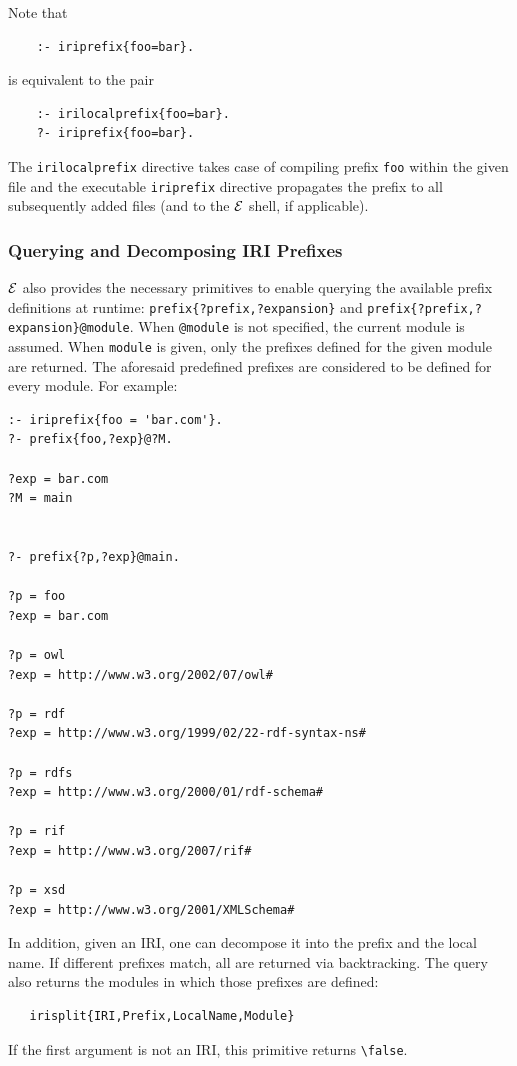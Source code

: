 \documentclass[11pt]{article}
\newcommand{\ERGO}{\mbox{\ensuremath{\cal{E}}\smaller{{\sc{RGO}}}}\xspace}
\newcommand{\FLSYSTEM}{\ERGO}
\newcommand{\bs}{\textbackslash}
\begin{document}
Note that
\begin{verbatim}
    :- iriprefix{foo=bar}.
\end{verbatim}
is equivalent to the pair
\begin{verbatim}
    :- irilocalprefix{foo=bar}.
    ?- iriprefix{foo=bar}.
\end{verbatim}
The \texttt{irilocalprefix} directive  takes case of compiling prefix
\texttt{foo} within the given file and the executable \texttt{iriprefix}   
directive propagates the prefix to all subsequently added files (and to the
\FLSYSTEM shell, if applicable).

\subsubsection{Querying and Decomposing IRI Prefixes}

\FLSYSTEM also provides the necessary primitives to enable querying the
available prefix definitions at runtime:
\texttt{prefix\{?prefix,?expansion\}} and
\texttt{prefix\{?prefix,?expansion\}@module}.
When {\tt @module}  is not
specified, the current module is assumed. When {\tt module} is given,
only the prefixes defined for the given module are returned. The
aforesaid predefined prefixes are considered to be defined for every
module. For example:
\begin{verbatim}
:- iriprefix{foo = 'bar.com'}.
?- prefix{foo,?exp}@?M.

?exp = bar.com
?M = main


?- prefix{?p,?exp}@main.

?p = foo
?exp = bar.com

?p = owl
?exp = http://www.w3.org/2002/07/owl#

?p = rdf
?exp = http://www.w3.org/1999/02/22-rdf-syntax-ns#

?p = rdfs
?exp = http://www.w3.org/2000/01/rdf-schema#

?p = rif
?exp = http://www.w3.org/2007/rif#

?p = xsd
?exp = http://www.w3.org/2001/XMLSchema#
\end{verbatim}

In addition, given an IRI, one can decompose it into the prefix and the
local name. If different prefixes match, all are returned via backtracking.
The query also returns the modules in which those prefixes are defined:
\begin{verbatim}
   irisplit{IRI,Prefix,LocalName,Module}
\end{verbatim}
If the first argument is not an IRI, this primitive returns
\texttt{\bs{}false}.
\end{document}
